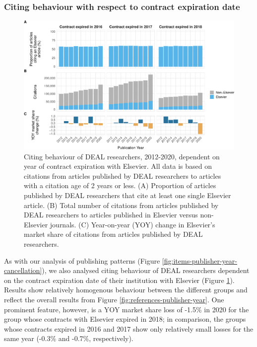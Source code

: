 \documentclass[
]{article}
\begin{document}
\hypertarget{citing-behaviour-with-respect-to-contract-expiration-date}{%
\subsubsection{Citing behaviour with respect to contract expiration date}\label{citing-behaviour-with-respect-to-contract-expiration-date}}

\begin{figure}

{\centering \includegraphics[width=0.833\linewidth]{analysis_files/figure-latex/references-publisher-year-cancellation-1} 

}

\caption{Citing behaviour of DEAL researchers, 2012-2020, dependent on year of contract expiration with Elsevier. All data is based on citations from articles published by DEAL researchers to articles with a citation age of 2 years or less. (A) Proportion of articles published by DEAL researchers that cite at least one single Elsevier article. (B) Total number of citations from articles published by DEAL researchers to articles published in Elsevier versus non-Elsevier journals. (C) Year-on-year (YOY) change in Elsevier's market share of citations from articles published by DEAL researchers.}\label{fig:references-publisher-year-cancellation}
\end{figure}

As with our analysis of publishing patterns (Figure \ref{fig:items-publisher-year-cancellation}), we also analysed citing behaviour of DEAL researchers dependent on the contract expiration date of their institution with Elsevier (Figure \ref{fig:references-publisher-year-cancellation}). Results show relatively homogenous behaviour between the different groups and reflect the overall results from Figure \ref{fig:references-publisher-year}. One prominent feature, however, is a YOY market share loss of -1.5\% in 2020 for the group whose contracts with Elsevier expired in 2018; in comparison, the groups whose contracts expired in 2016 and 2017 show only relatively small losses for the same year (-0.3\% and -0.7\%, respectively).
\end{document}
